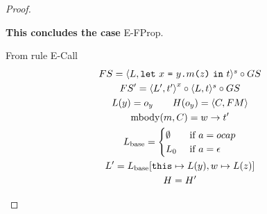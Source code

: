 \begin{proof}
\begin{description}
\begin{description}
\begin{description}
              {\bf This concludes the case} {\sc E-FProp}.
          \end{description}
        \item[Case {\sc E-Call}:] From rule {\sc E-Call}
          \begin{equation}
            \begin{gathered}
              FS = \mbox{$\langle L, \mbox{\texttt{let}~$x$~\texttt{=}~$\mbox{$y$\texttt{.}$m$\texttt{(}$z$\texttt{)}}$~\texttt{in}~$t$} \rangle^s$} \circ GS \\
              FS' = \mbox{$\langle L', t' \rangle$}^x \circ \mbox{$\langle L, t \rangle^s$} \circ GS \\
              L(y) = o_y \quad\quad H(o_y) = \mbox{$\langle C, FM \rangle$} \\
              \mbox{$\mathrm{mbody}$}(m, C) = w \to t' \\
              L_{\text{base}} =
              \begin{cases}
                \emptyset & \text{ if } a = \mbox{$ocap$} \\
                L_0       & \text{ if } a = \mbox{$\epsilon$}
              \end{cases} \\
              L' = L_{\text{base}}[\mbox{\texttt{this}} \mapsto L(y), w \mapsto L(z)] \\
              H = H'
            \end{gathered}
          \end{equation}

          

      \end{description}
  \end{description}
\end{proof}








